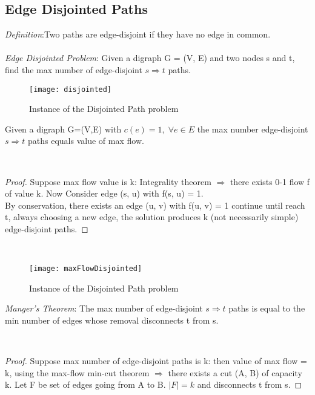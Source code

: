 \subsection{Edge Disjointed Paths}
\emph{Definition}:Two paths are edge-disjoint if they have no edge in common.\\\\
\emph{Edge Disjointed Problem}: Given a digraph G = (V, E) and two nodes s and t, find the max number of edge-disjoint $s \Rightarrow t$ paths.


\begin{figure}[H]
    \centering
    \texttt{[image: disjointed]}
    \caption{Instance of the Disjointed Path problem}
\end{figure}

\begin{claim}
    Given a digraph G=(V,E) with $c(e) = 1,\; \forall e \in E$ the max number edge-disjoint $s \Rightarrow t $ paths equals value of max flow.
\end{claim}\\

\begin{proof}
    Suppose max flow value is k: Integrality theorem $ \Rightarrow $  there exists 0-1 flow f of value k. Now Consider edge (s, u) with f(s, u) = 1.\\
    By conservation, there exists an edge (u, v) with f(u, v) = 1 continue until reach t, always choosing a new edge, the solution produces k (not necessarily simple) edge-disjoint paths.
\end{proof}\\

\begin{figure}[H]
    \centering
    \texttt{[image: maxFlowDisjointed]}
    \caption{Instance of the Disjointed Path problem}
\end{figure}

\begin{claim}
    \emph{Manger's Theorem}: The max number of edge-disjoint $s \Rightarrow t$ paths is equal to the min number of edges whose removal disconnects t from s.
\end{claim}\\

\begin{proof}
    Suppose max number of edge-disjoint paths is k: then value of max flow = k, using the max-flow min-cut theorem $  \Rightarrow $ there exists a cut (A, B) of capacity k. Let F be set of edges going from A to B.
    $|F| = k$ and disconnects t from s.
\end{proof}\\

